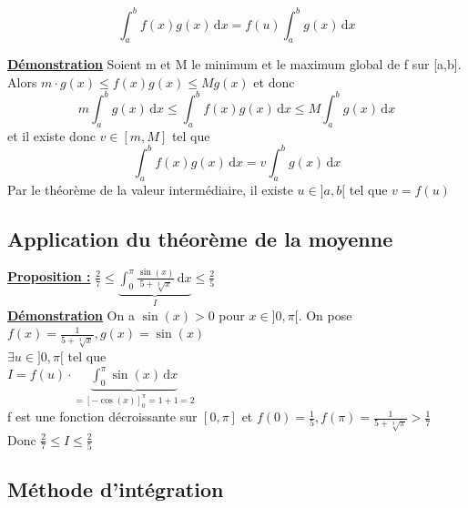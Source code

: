 \documentclass[12pt,a4paper]{article}
\newcommand{\evid}[1]{\textbf{\underline{#1}}}
\newcommand{\intx}[3]{\ensuremath{\int_{#1}^{#2} #3 \, \mathrm dx}}
\begin{document}
{\begin{boite}
\begin{equation}
	\intx{a}{b}{f(x)g(x)} = f(u)\intx{a}{b}{g(x)}
\end{equation}
\end{boite}
\evid{Démonstration}
Soient m et M le minimum et le maximum global de f sur [a,b]. Alors $m\cdot g(x) \leq f(x)g(x) \leq Mg(x)$ et donc
\begin{equation}
	m\intx{a}{b}{g(x)} \leq \intx{a}{b}{f(x)g(x)} \leq M\intx{a}{b}{g(x)}
\end{equation}
et il existe donc $v \in [m,M]$ tel que 
\begin{equation}
	\intx{a}{b}{f(x)g(x)} = v\intx{a}{b}{g(x)}
\end{equation}
Par le théorème de la valeur intermédiaire, il existe $u \in]a,b[$ tel que $v = f(u)$
\newpage
\subsection{Application du théorème de la moyenne}
\evid{Proposition :} $\frac{2}{7	} \leq \underbrace{\intx{0}{\pi}{\frac{\sin(x)}{5+\sqrt[3]{x}}}}_I \leq \frac{2}{5}$\\
\evid{Démonstration} On a $\sin(x) > 0$ pour $x \in ]0,\pi[$. On pose \\
$f(x) = \frac{1}{5+\sqrt[3]{x}}, g(x) = \sin(x)$\\
$\exists u \in ]0,\pi[$ tel que \\
$I= f(u) \cdot \underbrace{\intx{0}{\pi}{\sin(x)}}_{= [-\cos(x)]_0^\pi = 1+1 = 2}$\\
f est une fonction décroissante sur $[0,\pi]$ et $f(0) = \frac{1}{5}, f(\pi) = \frac{1}{5+\sqrt[3]{\pi}} > \frac{1}{7}$\\
Donc $\frac{2}{7} \leq I \leq \frac{2}{5}$
\subsection{Méthode d'intégration}
}
\end{document}
